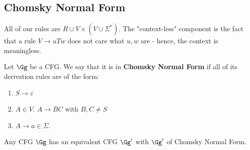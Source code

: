 \subsection{Chomsky Normal Form}
All of our rules are  $R\cup V\times (V\cup \Sigma^*)$. The "context-less" component is the fact that a rule $V\to uTw$ does not care what $u,w$ are - hence, the context is meaningless. 
\begin{yellowBox}
	\begin{defn}
		 Let $\Gg$ be a CFG. We say that it is in \textbf{Chomsky Normal Form} if all of its derivation rules are of the form:
		\begin{enumerate}
			\item $S\to \varepsilon$
			\item $A\in  V$. $A \to BC$ with $B,C\neq S$
			\item $A \to a\in \Sigma$.
		\end{enumerate}
	\end{defn}
\end{yellowBox}
\begin{blueBox}
	\begin{thm}
		[Normalization]
		Any CFG $\Gg$ has an equivalent CFG $\Gg'$ with $\Gg'$ of Chomsky Normal Form.
	\end{thm}
\end{blueBox}

